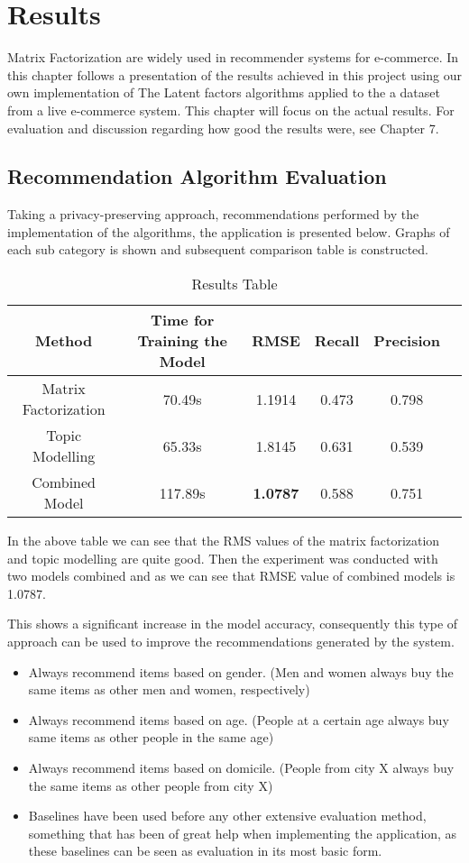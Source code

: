 \chapter{Results}
Matrix Factorization are widely used in recommender systems for e-commerce. In this chapter follows a presentation of the results achieved in this project using our own implementation of The Latent factors algorithms applied to the a dataset from a live e-commerce system. This chapter will focus on the actual results. For evaluation and discussion regarding how good the results were, see Chapter 7.

\section{Recommendation Algorithm Evaluation}
Taking a privacy-preserving approach, recommendations performed by the implementation of the algorithms, the application is presented below. Graphs of each sub category is shown and subsequent comparison table is constructed.

\begin{table}[h]
\centering
\begin{tabular}{| c | c | c | c | c | c |}
\hline
\textbf{Method} & \textbf{Time for Training the Model} & \textbf{RMSE} & \textbf{Recall} & \textbf{Precision}  \\
\hline
Matrix Factorization & 70.49s & 1.1914 & 0.473 & 0.798  \\
\hline
Topic Modelling & 65.33s & 1.8145 & 0.631 & 0.539 \\
\hline
Combined Model & 117.89s  & \textbf{1.0787} & 0.588 & 0.751 \\ 
\hline          
\end{tabular}
\caption{Results Table}
\label{Results Table}
\end{table}

In the above table we can see that the RMS values of the matrix factorization and topic modelling are quite good.
Then the experiment was conducted with two models combined and as we can see that RMSE value of combined models is 1.0787.

This shows a significant increase in the model accuracy, consequently this type of approach can be used to improve the recommendations generated by the system.

\begin{itemize}
    \item Always recommend items based on gender. (Men and women always buy the same items as other men and women, respectively)
    \item Always recommend items based on age. (People at a certain age always buy same items as other people in the same age)
    \item Always recommend items based on domicile. (People from city X always buy the same items as other people from city X)
    \item Baselines have been used before any other extensive evaluation method, something that has been of great help when implementing the application, as these baselines can be seen as evaluation in its most basic form.
    
    \end{itemize}


